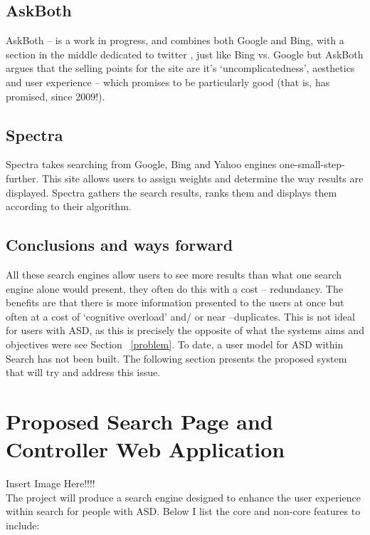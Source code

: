 \documentclass[10pt]{article}
\begin{document}
\subsection{AskBoth}
AskBoth – is a work in progress, and combines both Google and Bing, with a section in the middle dedicated to twitter , just like Bing vs. Google but AskBoth argues that the selling points for the site are it’s ‘uncomplicatedness’, aesthetics and user experience – which promises to be particularly good (that is, has promised, since 2009!).

\subsection{Spectra}
Spectra takes searching from Google, Bing and Yahoo engines one-small-step-further. This site allows users to assign weights and determine the way results are displayed. Spectra gathers the search results, ranks them and displays them according to their algorithm. 

\subsection{Conclusions and ways forward}
All these search engines allow users to see more results than what one search engine alone would present, they often do this with a cost -- redundancy. The benefits are that there is more information presented to the users at once but often at a cost of ‘cognitive overload’ and/ or near –duplicates. This is not ideal for users with ASD, as this is precisely the opposite of what the systems aims and objectives were see Section ~\ref{problem}.
To date, a user model for ASD within Search has not been built. The following section presents the proposed system that will try and address this issue.


\section{Proposed Search Page and Controller Web Application}

Insert Image Here!!!!\\The project will produce a search engine designed to enhance the user experience within search for people with ASD. Below I list the core and non-core features to include:
\end{document}
